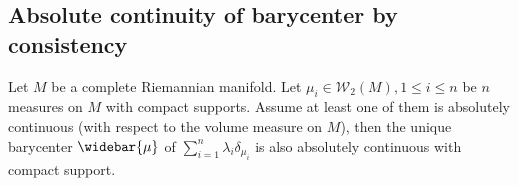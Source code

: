 \subsection{Absolute continuity of barycenter by consistency}

\begin{thm}[Absolute continuity of the barycenter of $\sum_{i=1}^n \lambda_i \delta_{\mu_i}$]
	\label{thm:absolute_continuity_discrete}
	Let $M$ be a complete Riemannian manifold.
	Let $\mu_i \in \mathcal{W}_2(M), 1 \leq i \leq n $ be $n$ measures on $M$ with compact supports.
	Assume at least one of them is absolutely continuous
	(with respect to the volume measure on $M$),
	then the unique barycenter $\widebar{\mu}$ of $\sum_{i=1}^n \lambda_i \delta_{\mu_i}$ is also absolutely continuous
	with compact support.
\end{thm}

